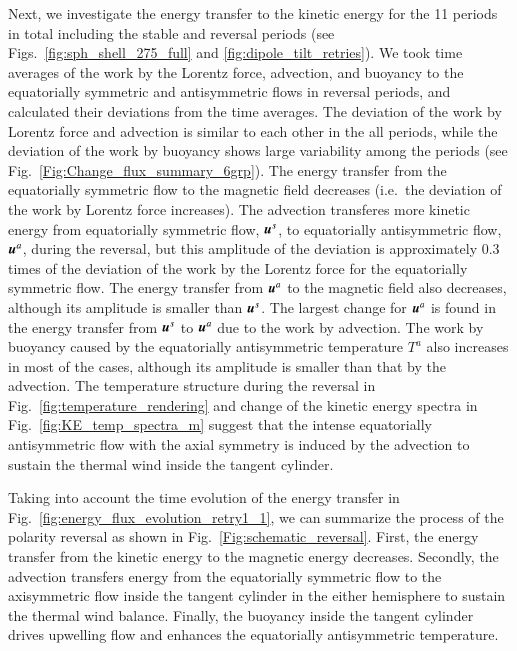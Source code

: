Next, we investigate the energy transfer to the kinetic energy for the 11 periods in total including the stable and reversal periods (see Figs.\ \ref{fig:sph_shell_275_full} and \ref{fig:dipole_tilt_retries}).
We took time averages of the work by the Lorentz force, advection, and buoyancy to the equatorially symmetric and antisymmetric flows in reversal periods, and calculated their deviations from the time averages.
The deviation of the work by Lorentz force and advection is similar to each other in the all periods, while the deviation of the work by buoyancy shows large variability among the periods (see Fig.~\ref{Fig:Change_flux_summary_6grp}).
The energy transfer from the equatorially symmetric flow to the magnetic field decreases (i.e.\ the deviation of the work by Lorentz force increases). 
The advection transferes more kinetic energy from equatorially symmetric flow, $\mbox{\boldmath$u$}^s$, to equatorially antisymmetric flow, $\mbox{\boldmath$u$}^a$, during the reversal, but this amplitude of the deviation is approximately 0.3 times of the deviation of the work by the Lorentz force for the equatorially symmetric flow.
The energy transfer from $\mbox{\boldmath$u$}^a$ to the magnetic field also decreases, although its amplitude is smaller than $\mbox{\boldmath$u$}^s$.
The largest change for $\mbox{\boldmath$u$}^a$ is found in the energy transfer from $\mbox{\boldmath$u$}^s$ to $\mbox{\boldmath$u$}^a$ due to the work by advection. 
The work by buoyancy caused by the equatorially antisymmetric temperature $T^{a}$ also increases in most of the cases, although its amplitude is smaller than that by the advection. 
The temperature structure during the reversal in Fig.~\ref{fig:temperature_rendering} and change of the kinetic energy spectra in Fig.~\ref{fig:KE_temp_spectra_m} suggest that the intense equatorially antisymmetric flow with the axial symmetry is induced by the advection to sustain the thermal wind inside the tangent cylinder. 

Taking into account the time evolution of the energy transfer in Fig.~\ref{fig:energy_flux_evolution_retry1_1}, we can summarize the process of the polarity reversal as shown in Fig.~\ref{Fig:schematic_reversal}. 
First, the energy transfer 
from the kinetic energy
to the magnetic energy decreases. 
Secondly, the advection transfers energy from the equatorially symmetric flow to the axisymmetric flow inside the tangent cylinder in the either hemisphere to sustain the thermal wind balance. 
Finally, the buoyancy inside the tangent cylinder drives upwelling flow and enhances the equatorially antisymmetric temperature.

